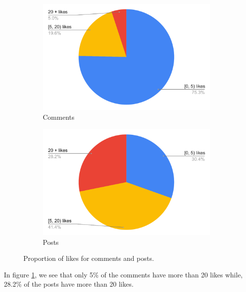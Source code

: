 \documentclass[
	11pt
] {article}
\begin{document}
	\begin{figure}[H]
		\centering
		\begin{subfigure}[b]{0.49\textwidth}
			\centering
			\includegraphics[width=\textwidth]{fig-proportion-of-comments-by-likes}
			\caption{Comments}
		\end{subfigure}
		\hfill
		\begin{subfigure}[b]{0.49\textwidth}
			\centering
			\includegraphics[width=\textwidth]{fig-proportion-of-posts-by-likes}
			\caption{Posts}
		\end{subfigure}
		\caption{Proportion of likes for comments and posts.}
		\label{fig-proportion-of-comments-or-posts-by-likes}
	\end{figure}

	In figure \ref{fig-proportion-of-comments-or-posts-by-likes}, we see that only \num{5}\% of the comments have more than \num{20} likes while, \num{28.2}\% of the posts have more than \num{20} likes.
\end{document}
